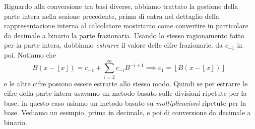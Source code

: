 Riguardo alla conversione tra basi diverse, abbiamo trattato la gestione della
parte intera nella sezione precedente, prima di entra nel dettaglio della
rappresentazione interna al calcolatore mostriamo come convertire in
particolare da decimale a binario la parte frazionaria.
Usando lo stesso ragionamento fatto per la parte intera, dobbiamo
\emph{estrarre} il valore delle cifre frazionarie, da $c_{-1}$ in poi. 
Notiamo che \[
B(x - \left\lfloor x \right \rfloor) = c_{-1} + \sum_{i=2}^{\infty} c_{-i}B^{-i+1}
\implies c_1 = \left\lfloor B(x - \left\lfloor x \right\rfloor) \right\rfloor \]
e le altre cifre possono essere estratte allo stesso modo. 
Quindi se per estrarre le cifre della parte intera usavamo un metodo basato
sulle divisioni ripetute per la base, in questo caso usiamo un metodo basato
su \emph{moltiplicazioni} ripetute per la base.
Vediamo un esempio, prima in decimale, e poi di conversione da decimale a binario.

